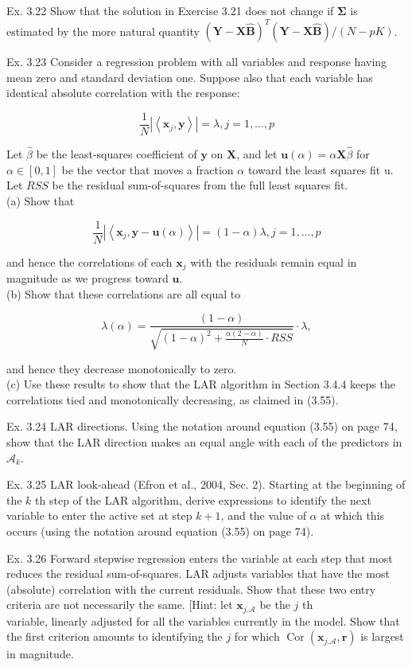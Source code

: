 \documentclass[10pt]{article}
\begin{document}
Ex. 3.22 Show that the solution in Exercise 3.21 does not change if $\boldsymbol{\Sigma}$ is estimated by the more natural quantity $(\mathbf{Y}-\mathbf{X} \hat{\mathbf{B}})^{T}(\mathbf{Y}-\mathbf{X} \hat{\mathbf{B}}) /(N-p K)$.

Ex. 3.23 Consider a regression problem with all variables and response having mean zero and standard deviation one. Suppose also that each variable has identical absolute correlation with the response:

$$
\frac{1}{N}\left|\left\langle\mathbf{x}_{j}, \mathbf{y}\right\rangle\right|=\lambda, j=1, \ldots, p
$$

Let $\hat{\beta}$ be the least-squares coefficient of $\mathbf{y}$ on $\mathbf{X}$, and let $\mathbf{u}(\alpha)=\alpha \mathbf{X} \hat{\beta}$ for $\alpha \in[0,1]$ be the vector that moves a fraction $\alpha$ toward the least squares fit u. Let $R S S$ be the residual sum-of-squares from the full least squares fit.\\
(a) Show that

$$
\frac{1}{N}\left|\left\langle\mathbf{x}_{j}, \mathbf{y}-\mathbf{u}(\alpha)\right\rangle\right|=(1-\alpha) \lambda, j=1, \ldots, p
$$

and hence the correlations of each $\mathbf{x}_{j}$ with the residuals remain equal in magnitude as we progress toward $\mathbf{u}$.\\
(b) Show that these correlations are all equal to

$$
\lambda(\alpha)=\frac{(1-\alpha)}{\sqrt{(1-\alpha)^{2}+\frac{\alpha(2-\alpha)}{N} \cdot R S S}} \cdot \lambda,
$$

and hence they decrease monotonically to zero.\\
(c) Use these results to show that the LAR algorithm in Section 3.4.4 keeps the correlations tied and monotonically decreasing, as claimed in (3.55).

Ex. 3.24 LAR directions. Using the notation around equation (3.55) on page 74, show that the LAR direction makes an equal angle with each of the predictors in $\mathcal{A}_{k}$.

Ex. 3.25 LAR look-ahead (Efron et al., 2004, Sec. 2). Starting at the beginning of the $k$ th step of the LAR algorithm, derive expressions to identify the next variable to enter the active set at step $k+1$, and the value of $\alpha$ at which this occurs (using the notation around equation (3.55) on page 74).

Ex. 3.26 Forward stepwise regression enters the variable at each step that most reduces the residual sum-of-squares. LAR adjusts variables that have the most (absolute) correlation with the current residuals. Show that these two entry criteria are not necessarily the same. [Hint: let $\mathbf{x}_{j . \mathcal{A}}$ be the $j$ th\\
variable, linearly adjusted for all the variables currently in the model. Show that the first criterion amounts to identifying the $j$ for which $\operatorname{Cor}\left(\mathbf{x}_{j . \mathcal{A}}, \mathbf{r}\right)$ is largest in magnitude.
\end{document}
